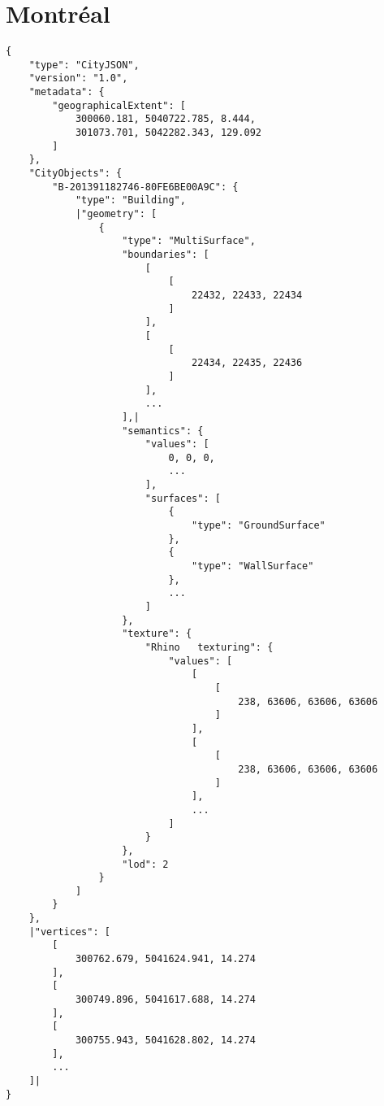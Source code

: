\section{Montréal}

\begin{scriptsize}
\begin{minipage}[c]{\linewidth / 1}


\begin{lstlisting}[frame=single,style=base,caption={Snippet of Montréal dataset}, label=dataset:montreal]
{
    "type": "CityJSON",
    "version": "1.0",
    "metadata": {
        "geographicalExtent": [
            300060.181, 5040722.785, 8.444,
            301073.701, 5042282.343, 129.092
        ]
    },
    "CityObjects": {
        "B-201391182746-80FE6BE00A9C": {
            "type": "Building",
            |"geometry": [
                {
                    "type": "MultiSurface",
                    "boundaries": [
                        [
                            [
                                22432, 22433, 22434
                            ]
                        ],
                        [
                            [
                                22434, 22435, 22436
                            ]
                        ],
                        ...
                    ],|
                    "semantics": {
                        "values": [
                            0, 0, 0,
                            ...
                        ],
                        "surfaces": [
                            {
                                "type": "GroundSurface"
                            },
                            {
                                "type": "WallSurface"
                            },
                            ...
                        ]
                    },
                    "texture": {
                        "Rhino   texturing": {
                            "values": [
                                [
                                    [
                                        238, 63606, 63606, 63606
                                    ]
                                ],
                                [
                                    [
                                        238, 63606, 63606, 63606
                                    ]
                                ],
                                ...
                            ]
                        }
                    },
                    "lod": 2
                }
            ]
        }
    },
    |"vertices": [
        [
            300762.679, 5041624.941, 14.274
        ],
        [
            300749.896, 5041617.688, 14.274
        ],
        [
            300755.943, 5041628.802, 14.274
        ],
        ...
    ]|
}
\end{lstlisting}


\end{minipage}
\end{scriptsize}



